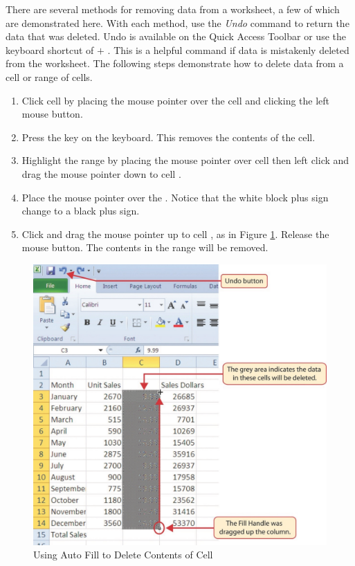 There are several methods for removing data from a worksheet, a few of which are demonstrated here. With each method, use the \textit{Undo} command to return the data that was deleted. Undo is available on the Quick Access Toolbar or use the keyboard shortcut of  $ + $ . This is a helpful command if data is mistakenly deleted from the worksheet. The following steps demonstrate how to delete data from a cell or range of cells.

\begin{enumerate}
	\item Click cell  by placing the mouse pointer over the cell and clicking the left mouse button.
	\item Press the  key on the keyboard. This removes the contents of the cell.
	\item Highlight the range  by placing the mouse pointer over cell  then left click and drag the mouse pointer down to cell .
	\item Place the mouse pointer over the . Notice that the white block plus sign change to a black plus sign.
	\item Click and drag the mouse pointer up to cell , as in Figure \ref{01:fig21}. Release the mouse button. The contents in the range  will be removed.
\end{enumerate}

\begin{figure}[H]
	\centering
	\includegraphics[width=\maxwidth{.95\linewidth}]{gfx/ch01_fig21}
	\caption{Using Auto Fill to Delete Contents of Cell}
	\label{01:fig21}
\end{figure}

